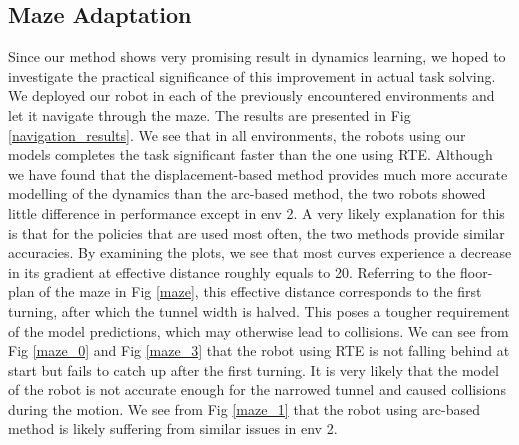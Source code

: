 \subsection{Maze Adaptation}


Since our method shows very promising result in dynamics learning, we hoped to
investigate the practical significance of this improvement in actual task solving.
We deployed our robot in each of the previously encountered environments and let it navigate through the maze.
The results are presented in Fig \ref{navigation_results}. 
We see that in all environments, the robots using our models completes the task significant faster than the one using RTE.
Although we have found that the displacement-based method provides much more accurate modelling of the dynamics than the arc-based method, the two robots showed little difference in performance except in env 2.
A very likely explanation for this is that for the policies that are used most often, the two methods provide similar accuracies.
By examining the plots, we see that most curves experience a decrease in its gradient at effective distance roughly equals to 20.
Referring to the floor-plan of the maze in Fig \ref{maze}, this effective distance corresponds to the first turning, after which the tunnel width is halved.
This poses a tougher requirement of the model predictions, which may otherwise lead to collisions.
We can see from Fig \ref{maze_0} and Fig \ref{maze_3} that the robot using RTE 
is not falling behind at start but fails to catch up after the first turning.
It is very likely that the model of the robot is not accurate enough for the narrowed tunnel and caused collisions during the motion.
We see from Fig \ref{maze_1} that the robot using arc-based method is likely suffering from similar issues in env 2.

